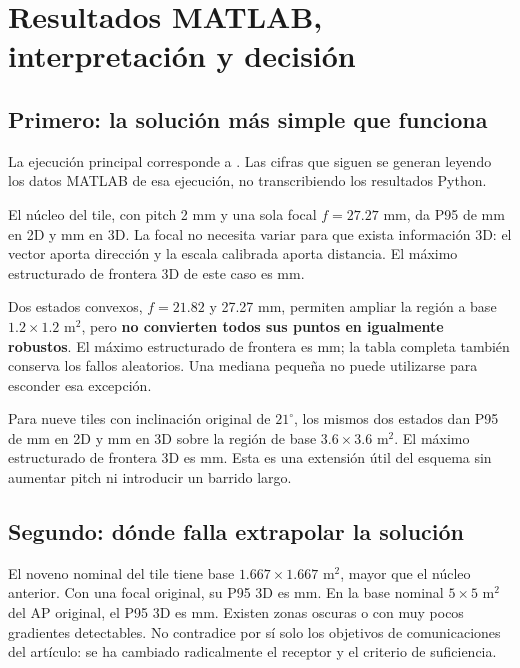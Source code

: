 \section{Resultados MATLAB, interpretación y decisión}
\subsection{Primero: la solución más simple que funciona}
La ejecución principal corresponde a \DirectorioResultados. Las cifras que siguen se generan leyendo los datos MATLAB de esa ejecución, no transcribiendo los resultados Python.

\begin{table}[H]\centering

\caption{Percentil 95 del error euclídeo en realizaciones aleatorias. El lado corresponde a la base cuadrada en $z=0$; en 3D se usan los troncos de la sección anterior, no prismas. Todas estas filas suponen ganancia y normal conocidas.}
\end{table}

El núcleo del tile, con pitch 2 mm y una sola focal $f=27.27$ mm, da P95 de \TilePdos{} mm en 2D y \TilePtres{} mm en 3D. La focal no necesita variar para que exista información 3D: el vector aporta dirección y la escala calibrada aporta distancia. El máximo estructurado de frontera 3D de este caso es \TileFrontera{} mm.

Dos estados convexos, $f=21.82$ y 27.27 mm, permiten ampliar la región a base $1.2\times1.2$ m$^2$, pero \textbf{no convierten todos sus puntos en igualmente robustos}. El máximo estructurado de frontera es \ParFrontera{} mm; la tabla completa también conserva los fallos aleatorios. Una mediana pequeña no puede utilizarse para esconder esa excepción.

Para nueve tiles con inclinación original de $21^\circ$, los mismos dos estados dan P95 de \GridPdos{} mm en 2D y \GridPtres{} mm en 3D sobre la región de base $3.6\times3.6$ m$^2$. El máximo estructurado de frontera 3D es \GridFrontera{} mm. Esta es una extensión útil del esquema sin aumentar pitch ni introducir un barrido largo.

\subsection{Segundo: dónde falla extrapolar la solución}
El noveno nominal del tile tiene base $1.667\times1.667$ m$^2$, mayor que el núcleo anterior. Con una focal original, su P95 3D es \TileNovenoPtres{} mm. En la base nominal $5\times5$ m$^2$ del AP original, el P95 3D es \GridOriginalPtres{} mm. Existen zonas oscuras o con muy pocos gradientes detectables. No contradice por sí solo los objetivos de comunicaciones del artículo: se ha cambiado radicalmente el receptor y el criterio de suficiencia.

